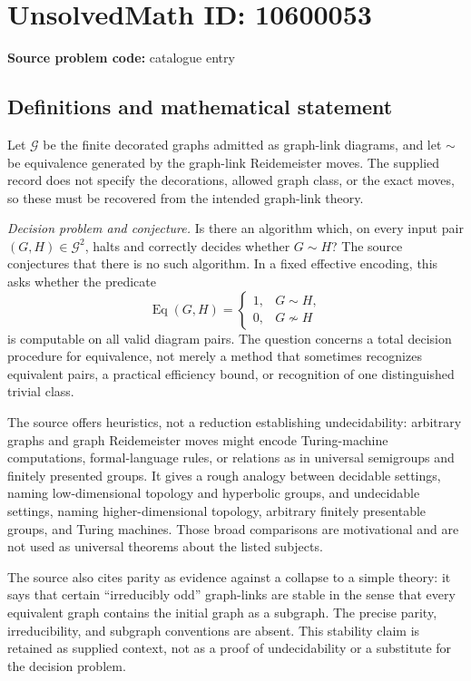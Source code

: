 \documentclass[11pt]{article}
\begin{document}
\section*{UnsolvedMath ID: 10600053}
\textbf{Source problem code:} catalogue entry
\subsection{Definitions and mathematical statement}
Let \(\mathcal G\) be the finite decorated graphs admitted as graph-link diagrams, and let \(\sim\) be equivalence generated by the graph-link Reidemeister moves. The supplied record does not specify the decorations, allowed graph class, or the exact moves, so these must be recovered from the intended graph-link theory.

\emph{Decision problem and conjecture.} Is there an algorithm which, on every input pair \((G,H)\in\mathcal G^2\), halts and correctly decides whether \(G\sim H\)? The source conjectures that there is no such algorithm. In a fixed effective encoding, this asks whether the predicate
\[
 \operatorname{Eq}(G,H)=
 \begin{cases}1,&G\sim H,\\0,&G\not\sim H\end{cases}
\]
is computable on all valid diagram pairs. The question concerns a total decision procedure for equivalence, not merely a method that sometimes recognizes equivalent pairs, a practical efficiency bound, or recognition of one distinguished trivial class.

The source offers heuristics, not a reduction establishing undecidability: arbitrary graphs and graph Reidemeister moves might encode Turing-machine computations, formal-language rules, or relations as in universal semigroups and finitely presented groups. It gives a rough analogy between decidable settings, naming low-dimensional topology and hyperbolic groups, and undecidable settings, naming higher-dimensional topology, arbitrary finitely presentable groups, and Turing machines. Those broad comparisons are motivational and are not used as universal theorems about the listed subjects.

The source also cites parity as evidence against a collapse to a simple theory: it says that certain ``irreducibly odd'' graph-links are stable in the sense that every equivalent graph contains the initial graph as a subgraph. The precise parity, irreducibility, and subgraph conventions are absent. This stability claim is retained as supplied context, not as a proof of undecidability or a substitute for the decision problem.
\end{document}

